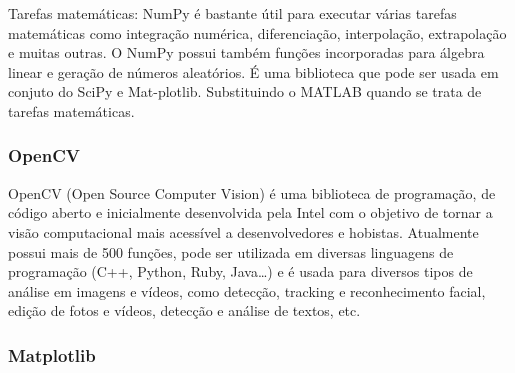 Tarefas matemáticas: NumPy é bastante útil para executar várias tarefas matemáticas como integração numérica, diferenciação, interpolação, extrapolação e muitas outras. O NumPy possui também funções incorporadas para álgebra linear e geração de números aleatórios. É uma biblioteca que pode ser usada em conjuto do SciPy e Mat-plotlib. Substituindo o MATLAB quando se trata de tarefas matemáticas.

\subsubsection{OpenCV}

OpenCV (Open Source Computer Vision) é uma biblioteca de programação, de código aberto e inicialmente desenvolvida pela Intel com o objetivo de tornar a visão computacional mais acessível a desenvolvedores e hobistas. Atualmente possui mais de 500 funções, pode ser utilizada em diversas linguagens de programação (C++, Python, Ruby, Java…) e é usada para diversos tipos de análise em imagens e vídeos, como  detecção, tracking e reconhecimento facial, edição de fotos e vídeos, detecção e análise de textos, etc. 

\subsubsection{Matplotlib}